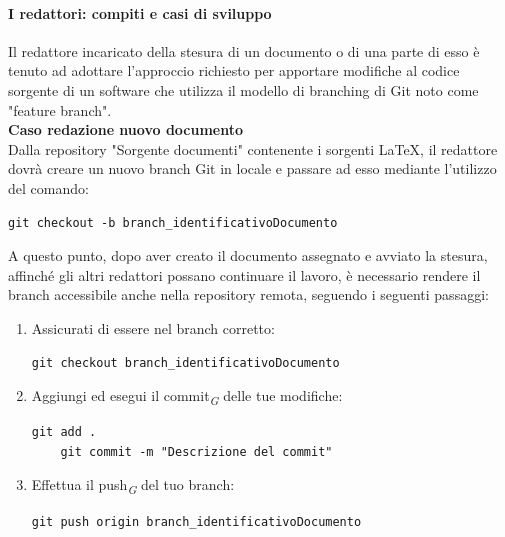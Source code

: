 \documentclass{article}
\begin{document}
    \paragraph{I redattori: compiti e casi di sviluppo}

    Il redattore incaricato della stesura di un documento o di una parte di esso è tenuto ad adottare l'approccio richiesto per apportare modifiche al codice sorgente di un software che utilizza il modello di branching di Git noto come "feature branch".\\
    \vspace{0.1cm}
    \textbf{Caso redazione nuovo documento}\\
Dalla repository  "Sorgente documenti" contenente i sorgenti \LaTeX, il redattore dovrà creare un nuovo branch Git in locale e passare ad esso mediante l'utilizzo del comando:

    \begin{lstlisting}[style=code]
    git checkout -b branch_identificativoDocumento 
    \end{lstlisting}

    A questo punto, dopo aver creato il documento assegnato e avviato la stesura, affinché gli altri redattori possano continuare il lavoro, è necessario rendere il branch accessibile anche nella repository remota, seguendo i seguenti passaggi:

    \begin{enumerate}
        \item Assicurati di essere nel branch corretto:
        \begin{lstlisting}[style=code]
    git checkout branch_identificativoDocumento 
        \end{lstlisting}

        \item Aggiungi ed esegui il commit\textsubscript{\textit{G}} delle tue modifiche:
        \begin{lstlisting}[style=code]
    git add .
    git commit -m "Descrizione del commit"
        \end{lstlisting}
        
        \item Effettua il push\textsubscript{\textit{G}} del tuo branch:
        \begin{lstlisting}[style=code]
    git push origin branch_identificativoDocumento
        \end{lstlisting}
    \end{enumerate}
\end{document}

